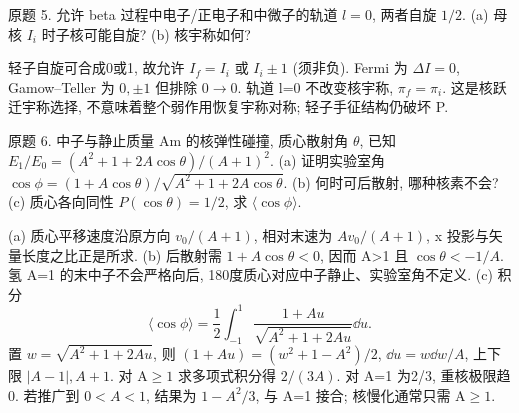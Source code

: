 \begin{exercise}\label{ex:2202-9-5}
原题 5. 允许 beta 过程中电子/正电子和中微子的轨道 $l=0$, 两者自旋 $1/2$. (a) 母核 $I_i$ 时子核可能自旋? (b) 核宇称如何?
\end{exercise}
\begin{solution}
轻子自旋可合成0或1, 故允许 $I_f=I_i$ 或 $I_i\pm1$ (须非负). Fermi 为 $\Delta I=0$, Gamow--Teller 为 $0,\pm1$ 但排除 $0\to0$. 轨道 l=0 不改变核宇称, $\pi_f=\pi_i$. 这是核跃迁宇称选择, 不意味着整个弱作用恢复宇称对称; 轻子手征结构仍破坏 P.
\end{solution}
\begin{exercise}\label{ex:2202-9-6}
原题 6. 中子与静止质量 Am 的核弹性碰撞, 质心散射角 $\theta$, 已知 $E_1/E_0=(A^2+1+2A\cos\theta)/(A+1)^2$. (a) 证明实验室角 $\cos\phi=(1+A\cos\theta)/\sqrt{A^2+1+2A\cos\theta}$. (b) 何时可后散射, 哪种核素不会? (c) 质心各向同性 $P(\cos\theta)=1/2$, 求 $\langle\cos\phi\rangle$.
\end{exercise}
\begin{solution}
(a) 质心平移速度沿原方向 $v_0/(A+1)$, 相对末速为 $Av_0/(A+1)$, x 投影与矢量长度之比正是所求. (b) 后散射需 $1+A\cos\theta<0$, 因而 A>1 且 $\cos\theta<-1/A$. 氢 A=1 的末中子不会严格向后, 180度质心对应中子静止、实验室角不定义. (c) 积分
\begin{equation}
 \langle\cos\phi\rangle=\frac12\int_{-1}^1\frac{1+Au}{\sqrt{A^2+1+2Au}}\dd u.
\end{equation}
置 $w=\sqrt{A^2+1+2Au}$, 则 $(1+Au)=(w^2+1-A^2)/2$, $\dd u=w\dd w/A$, 上下限 $|A-1|,A+1$. 对 A$\ge1$ 求多项式积分得 $2/(3A)$. 对 A=1 为2/3, 重核极限趋0. 若推广到 $0<A<1$, 结果为 $1-A^2/3$, 与 A=1 接合; 核慢化通常只需 A$\ge1$.
\end{solution}
